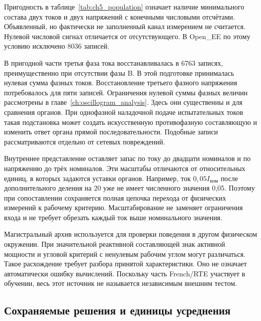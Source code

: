 Пригодность в таблице~\ref{tab:ch5_population} означает
наличие минимального состава двух токов и двух напряжений
с конечными числовыми отсчётами. Объявленный, но фактически
не заполненный канал измерением не считается.
Нулевой числовой сигнал отличается от отсутствующего.
В Open\_EE по этому условию исключено 8036 записей.

В пригодной части третья фаза тока восстанавливалась
в 6763 записях, преимущественно при отсутствии фазы B.
В этой подготовке принималась нулевая сумма фазных токов.
Восстановление третьего фазного напряжения потребовалось
для пяти записей. Ограничения нулевой суммы фазных
величин рассмотрены в главе~\ref{ch:oscillogram_analysis}.
Здесь они существенны и для сравнения органов.
При однофазной наладочной подаче испытательных токов такая подстановка
может создать искусственную противофазную составляющую
и изменить ответ органа прямой последовательности.
Подобные записи рассматриваются отдельно от сетевых повреждений.

Внутреннее представление оставляет запас по току
до двадцати номиналов и по напряжению до трёх номиналов.
Эти масштабы отличаются от относительных единиц,
в которых задаются уставки органов.
Например, ток $0{,}05I_{\text{ном}}$ после дополнительного
деления на 20 уже не имеет численного значения 0,05.
Поэтому при сопоставлении сохраняется полная цепочка
перехода от физических измерений к рабочему критерию.
Масштабирование не заменяет ограничения входа и не требует
обрезать каждый ток выше номинального значения.

Магистральный архив используется для проверки поведения
в другом физическом окружении. При значительной реактивной
составляющей знак активной мощности и угловой критерий
с ненулевым рабочим углом могут различаться.
Такое расхождение требует разбора принятой характеристики.
Оно не означает автоматически ошибку вычислений.
Поскольку часть French/RTE участвует в обучении,
весь этот источник не называется независимым внешним тестом.

{}


\subsection{Сохраняемые решения и единицы усреднения}

